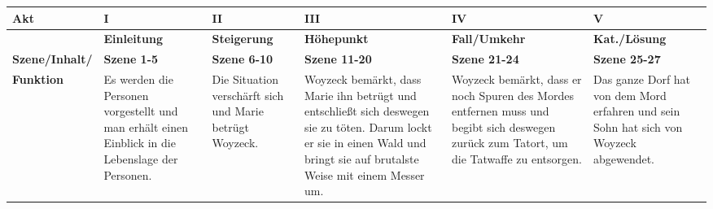 \documentclass[12pt, a4paper]{report}
\begin{document}
	\begin{tabularx}{\textwidth}{|X|X|X|X|X|X|}
	 \hline
	 \textbf{Akt} & \textbf{I} & \textbf{II} & \textbf{III} & \textbf{IV} & \textbf{V} \\
	 \hline
	 & \textbf{Einleitung} & \textbf{Steigerung} & \textbf{Höhepunkt} & \textbf{Fall/Umkehr} & \textbf{Kat./Lösung} \\
	 \hline
	 \textbf{Szene/Inhalt/} & \textbf{Szene 1-5} & \textbf{Szene 6-10} & \textbf{Szene 11-20} & \textbf{Szene 21-24} & \textbf{Szene 25-27} \\
	 \textbf{Funktion} & Es werden die Personen vorgestellt und man erhält einen Einblick in die Lebenslage der Personen. & Die Situation verschärft sich und Marie betrügt Woyzeck. & Woyzeck bemärkt, dass Marie ihn betrügt und entschließt sich deswegen sie zu töten. Darum lockt er sie in einen Wald und bringt sie auf brutalste Weise mit einem Messer um. & Woyzeck bemärkt, dass er noch Spuren des Mordes entfernen muss und begibt sich deswegen zurück zum Tatort, um die Tatwaffe zu entsorgen.& Das ganze Dorf hat von dem Mord erfahren und sein Sohn hat sich von Woyzeck abgewendet.\\
	 \hline
	\end{tabularx}
\end{document}
